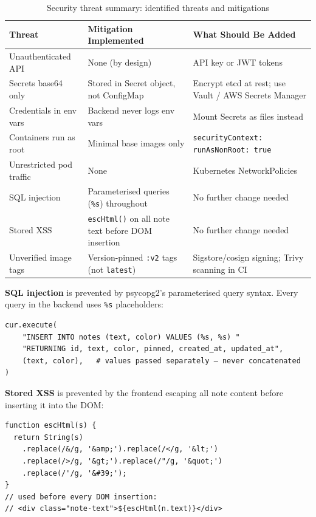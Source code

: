 \documentclass[12pt,a4paper]{article}
\begin{document}
\begin{table}[h]
\centering
\small
\begin{tabular}{@{}p{3.5cm}p{4cm}p{4.5cm}@{}}
\toprule
\textbf{Threat} & \textbf{Mitigation Implemented} & \textbf{What Should Be Added} \\
\midrule
Unauthenticated API & None (by design) & API key or JWT tokens \\
Secrets base64 only & Stored in Secret object, not ConfigMap & Encrypt etcd at rest; use Vault / AWS Secrets Manager \\
Credentials in env vars & Backend never logs env vars & Mount Secrets as files instead \\
Containers run as root & Minimal base images only & \texttt{securityContext: runAsNonRoot: true} \\
Unrestricted pod traffic & None & Kubernetes NetworkPolicies \\
SQL injection & Parameterised queries (\texttt{\%s}) throughout & No further change needed \\
Stored XSS & \texttt{escHtml()} on all note text before DOM insertion & No further change needed \\
Unverified image tags & Version-pinned \texttt{:v2} tags (not \texttt{latest}) & Sigstore/cosign signing; Trivy scanning in CI \\
\bottomrule
\end{tabular}
\caption{Security threat summary: identified threats and mitigations}
\end{table}

\textbf{SQL injection} is prevented by psycopg2's parameterised query syntax. Every query in the backend uses \texttt{\%s} placeholders:

\begin{lstlisting}[style=python, caption={Parameterised query preventing SQL injection (app.py)}]
cur.execute(
    "INSERT INTO notes (text, color) VALUES (%s, %s) "
    "RETURNING id, text, color, pinned, created_at, updated_at",
    (text, color),   # values passed separately — never concatenated
)
\end{lstlisting}

\textbf{Stored XSS} is prevented by the frontend escaping all note content before inserting it into the DOM:

\begin{lstlisting}[style=python, caption={HTML entity escaping preventing stored XSS (index.html)}]
function escHtml(s) {
  return String(s)
    .replace(/&/g, '&amp;').replace(/</g, '&lt;')
    .replace(/>/g, '&gt;').replace(/"/g, '&quot;')
    .replace(/'/g, '&#39;');
}
// used before every DOM insertion:
// <div class="note-text">${escHtml(n.text)}</div>
\end{lstlisting}
\end{document}
